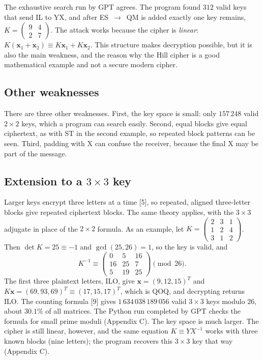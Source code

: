 \documentclass[11pt,a4paper]{article}
\newcommand{\vect}[1]{\begin{pmatrix}#1\end{pmatrix}}
\newcommand{\smat}[1]{\left(\begin{smallmatrix}#1\end{smallmatrix}\right)}
\newcommand{\x}{\mathbf{x}}   %
\theoremstyle{plain}
\theoremstyle{definition}
\begin{document}
The exhaustive search run by GPT agrees. The program found $312$ valid keys that send IL to YX, and after ES~$\to$~QM is added exactly one key remains, $K=\smat{9&4\\2&7}$. The attack works because the cipher is \emph{linear}: $K(\x_1+\x_2)\equiv K\x_1+K\x_2$. This structure makes decryption possible, but it is also the main weakness, and the reason why the Hill cipher is a good mathematical example and not a secure modern cipher.

\subsection{Other weaknesses}

There are three other weaknesses. First, the key space is small: only $157\,248$ valid $2\times2$ keys, which a program can search easily. Second, equal blocks give equal ciphertext, as with ST in the second example, so repeated block patterns can be seen. Third, padding with X can confuse the receiver, because the final X may be part of the message.

\subsection{\texorpdfstring{Extension to a $3\times3$ key}{Extension to a 3x3 key}}

Larger keys encrypt three letters at a time [5], so repeated, aligned three-letter blocks give repeated ciphertext blocks. The same theory applies, with the $3\times3$ adjugate in place of the $2\times2$ formula. As an example, let $K=\smat{2&3&1\\1&2&4\\3&1&2}$. Then $\det K=25\equiv-1$ and $\gcd(25,26)=1$, so the key is valid, and
\[
K^{-1}\equiv\vect{0&5&16\\16&25&7\\5&19&25}\pmod{26}.
\]
The first three plaintext letters, ILO, give $\x=(9,12,15)^T$ and $K\x=(69,93,69)^T\equiv(17,15,17)^T$, which is QOQ, and decrypting returns ILO. The counting formula [9] gives $1\,634\,038\,189\,056$ valid $3\times3$ keys modulo $26$, about $30.1\%$ of all matrices. The Python run completed by GPT checks the formula for small prime moduli (Appendix C). The key space is much larger. The cipher is still linear, however, and the same equation $K\equiv YX^{-1}$ works with three known blocks (nine letters); the program recovers this $3\times3$ key that way (Appendix C).

\end{document}
